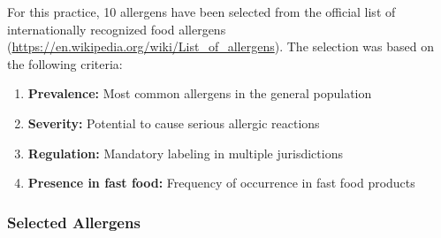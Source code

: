 \documentclass[12pt,a4paper]{article}
\begin{document}
For this practice, 10 allergens have been selected from the official list of internationally recognized food allergens (\url{https://en.wikipedia.org/wiki/List_of_allergens}). The selection was based on the following criteria:

\begin{enumerate}
    \item \textbf{Prevalence:} Most common allergens in the general population
    \item \textbf{Severity:} Potential to cause serious allergic reactions
    \item \textbf{Regulation:} Mandatory labeling in multiple jurisdictions
    \item \textbf{Presence in fast food:} Frequency of occurrence in fast food products
\end{enumerate}

\subsubsection{Selected Allergens}
\end{document}
